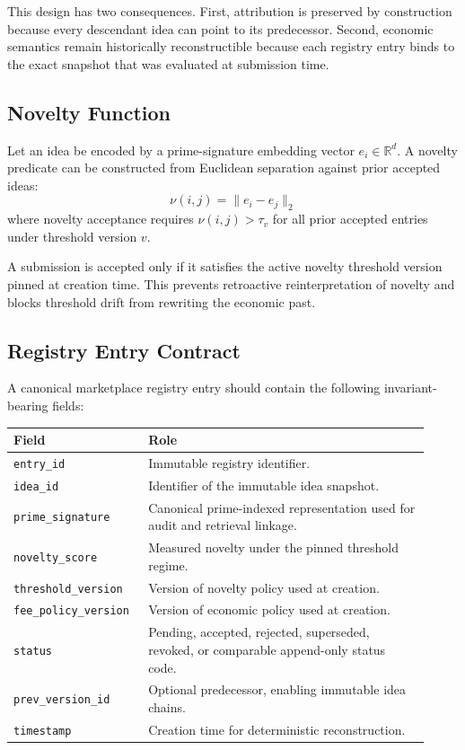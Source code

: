 \documentclass[11pt]{article}
\begin{document}
This design has two consequences. First, attribution is preserved by construction because every descendant idea can point to its predecessor. Second, economic semantics remain historically reconstructible because each registry entry binds to the exact snapshot that was evaluated at submission time.

\subsection{Novelty Function}
Let an idea be encoded by a prime-signature embedding vector \(e_i \in \mathbb{R}^d\). A novelty predicate can be constructed from Euclidean separation against prior accepted ideas:
\[
\nu(i,j) = \lVert e_i - e_j \rVert_2 \tag{1}
\]
where novelty acceptance requires \(\nu(i,j) > \tau_v\) for all prior accepted entries under threshold version \(v\).

A submission is accepted only if it satisfies the active novelty threshold version pinned at creation time. This prevents retroactive reinterpretation of novelty and blocks threshold drift from rewriting the economic past.

\subsection{Registry Entry Contract}
A canonical marketplace registry entry should contain the following invariant-bearing fields:
\begin{longtable}{p{0.28\linewidth} p{0.64\linewidth}}
\toprule
Field & Role \\
\midrule
\endhead
\texttt{entry\_id} & Immutable registry identifier. \\
\texttt{idea\_id} & Identifier of the immutable idea snapshot. \\
\texttt{prime\_signature} & Canonical prime-indexed representation used for audit and retrieval linkage. \\
\texttt{novelty\_score} & Measured novelty under the pinned threshold regime. \\
\texttt{threshold\_version} & Version of novelty policy used at creation. \\
\texttt{fee\_policy\_version} & Version of economic policy used at creation. \\
\texttt{status} & Pending, accepted, rejected, superseded, revoked, or comparable append-only status code. \\
\texttt{prev\_version\_id} & Optional predecessor, enabling immutable idea chains. \\
\texttt{timestamp} & Creation time for deterministic reconstruction. \\
\bottomrule
\end{longtable}
\end{document}
